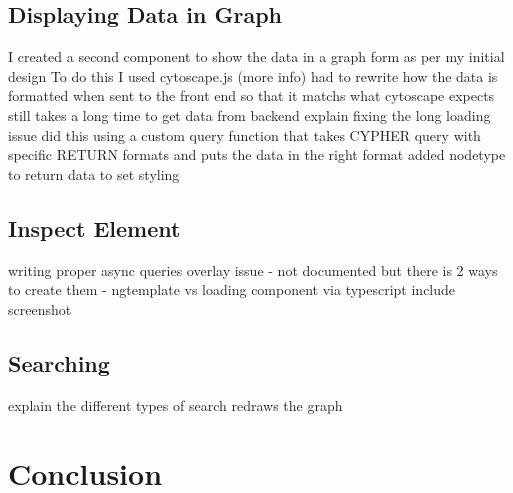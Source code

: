 \subsection{Displaying Data in Graph}
I created a second component to show the data in a graph form as per my initial design
To do this I used cytoscape.js (more info)
had to rewrite how the data is formatted when sent to the front end so that it matchs what cytoscape expects
still takes a long time to get data from backend 
explain fixing the long loading issue
did this using a custom query function that takes CYPHER query with specific RETURN formats and puts the data in the right format
added nodetype to return data to set styling
\subsection{Inspect Element}
writing proper async queries
overlay issue
- not documented but there is 2 ways to create them
- ngtemplate vs loading component via typescript
include screenshot
\subsection{Searching}
explain the different types of search
redraws the graph
\section{Conclusion}